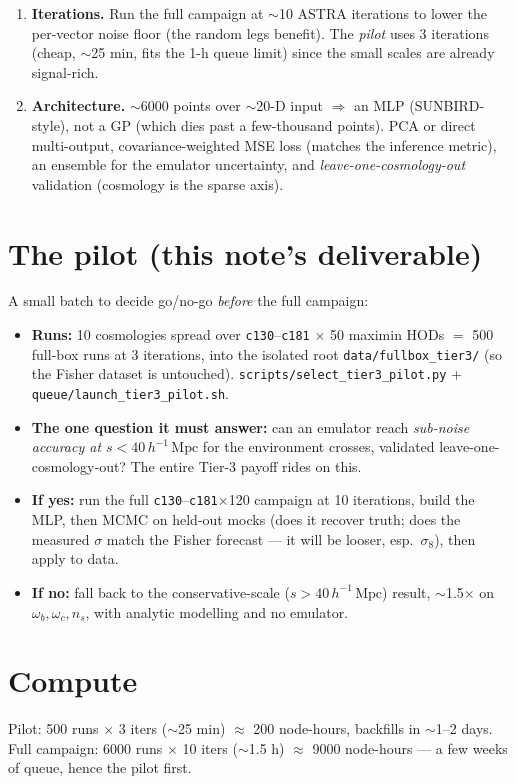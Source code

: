 \documentclass[11pt]{article}
\newcommand{\Mpch}{\,h^{-1}\,\mathrm{Mpc}}
\newcommand{\code}[1]{\texttt{#1}}
\begin{document}
\begin{enumerate}
\begin{itemize}
    $500\Mpch$ subboxes of the \code{ph000} boxes, $\sim$576 samples, with its
    open-boundary / non-independence / $\sim$10--20\% absolute caveats), unless an
    \emph{externally pre-populated} galaxy mock suite (e.g.\ EZmocks) is adopted.
    The ideal 1883 independent small-box covariance is therefore \emph{not}
    available under the no-new-HOD constraint.  This is the main residual weakness
    of Tier-3 as a measured-constraints path: the emulator fixes the derivatives,
    but the covariance remains approximate.
  \end{itemize}
\item \textbf{Iterations.}  Run the full campaign at $\sim$10 ASTRA iterations to
  lower the per-vector noise floor (the random legs benefit).  The \emph{pilot}
  uses 3 iterations (cheap, $\sim$25 min, fits the 1-h queue limit) since the
  small scales are already signal-rich.
\item \textbf{Architecture.}  $\sim$6000 points over $\sim$20-D input
  $\Rightarrow$ an MLP (SUNBIRD-style), not a GP (which dies past a few-thousand
  points).  PCA or direct multi-output, covariance-weighted MSE loss (matches the
  inference metric), an ensemble for the emulator uncertainty, and
  \emph{leave-one-cosmology-out} validation (cosmology is the sparse axis).
\end{enumerate}

\section{The pilot (this note's deliverable)}
A small batch to decide go/no-go \emph{before} the full campaign:
\begin{itemize}
\item \textbf{Runs:} 10 cosmologies spread over \code{c130}--\code{c181}
  $\times$ 50 maximin HODs $=$ 500 full-box runs at 3 iterations, into the
  isolated root \code{data/fullbox\_tier3/} (so the Fisher dataset is untouched).
  \code{scripts/select\_tier3\_pilot.py} + \code{queue/launch\_tier3\_pilot.sh}.
\item \textbf{The one question it must answer:} can an emulator reach
  \emph{sub-noise accuracy at $s<40\Mpch$} for the environment crosses, validated
  leave-one-cosmology-out?  The entire Tier-3 payoff rides on this.
\item \textbf{If yes:} run the full \code{c130}--\code{c181}$\times$120 campaign at
  10 iterations, build the MLP, then MCMC on held-out mocks (does it recover truth;
  does the measured $\sigma$ match the Fisher forecast --- it will be looser, esp.\
  $\sigma_8$), then apply to data.
\item \textbf{If no:} fall back to the conservative-scale ($s>40\Mpch$) result,
  $\sim$1.5$\times$ on $\omega_b,\omega_c,n_s$, with analytic modelling and no
  emulator.
\end{itemize}

\section{Compute}
Pilot: 500 runs $\times$ 3 iters ($\sim$25 min) $\approx$ 200 node-hours, backfills
in $\sim$1--2 days.  Full campaign: 6000 runs $\times$ 10 iters ($\sim$1.5 h)
$\approx$ 9000 node-hours --- a few weeks of queue, hence the pilot first.
\end{document}
